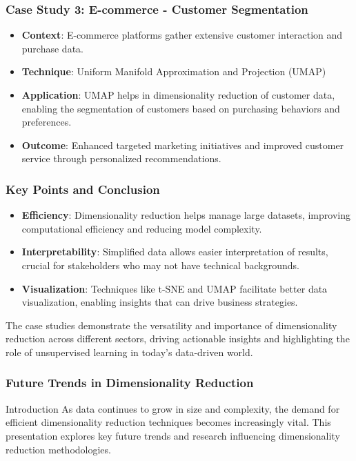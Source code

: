 \documentclass[aspectratio=169]{beamer}
\begin{document}
\begin{frame}[fragile]
    \frametitle{Case Study 3: E-commerce - Customer Segmentation}
    \begin{itemize}
        \item \textbf{Context}: E-commerce platforms gather extensive customer interaction and purchase data.
        \item \textbf{Technique}: Uniform Manifold Approximation and Projection (UMAP)
        \item \textbf{Application}: UMAP helps in dimensionality reduction of customer data, enabling the segmentation of customers based on purchasing behaviors and preferences.
        \item \textbf{Outcome}: Enhanced targeted marketing initiatives and improved customer service through personalized recommendations.
    \end{itemize}
\end{frame}

\begin{frame}[fragile]
    \frametitle{Key Points and Conclusion}
    \begin{itemize}
        \item \textbf{Efficiency}: Dimensionality reduction helps manage large datasets, improving computational efficiency and reducing model complexity.
        \item \textbf{Interpretability}: Simplified data allows easier interpretation of results, crucial for stakeholders who may not have technical backgrounds.
        \item \textbf{Visualization}: Techniques like t-SNE and UMAP facilitate better data visualization, enabling insights that can drive business strategies.
    \end{itemize}
    The case studies demonstrate the versatility and importance of dimensionality reduction across different sectors, driving actionable insights and highlighting the role of unsupervised learning in today's data-driven world.
\end{frame}

\begin{frame}
    \frametitle{Future Trends in Dimensionality Reduction}
    \begin{block}{Introduction}
        As data continues to grow in size and complexity, the demand for efficient dimensionality reduction techniques becomes increasingly vital. This presentation explores key future trends and research influencing dimensionality reduction methodologies.
    \end{block}
\end{frame}
\end{document}
